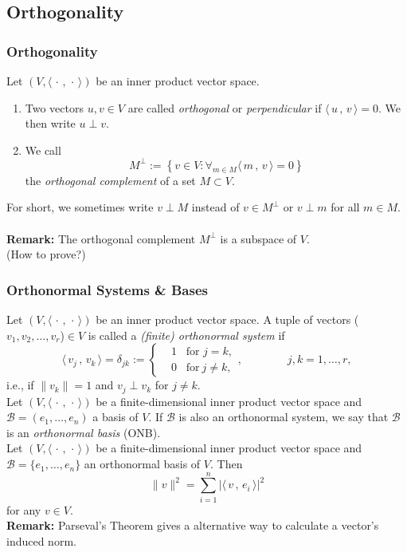 \documentclass[12pt, t]{beamer}
\renewcommand{\emph}[1]{{\color{Turquoise3}\textsl{#1}}}
\newcommand{\myseries}[2]{$#1_1,#1_2,\dots,#1_#2$}
\newcommand{\nullspace}{~\\[15pt]}
\newcommand{\remark}{\textbf{Remark: }}
\newcommand{\scp}[2]{\langle\,#1\,,\,#2\,\rangle} \newcommand{\scpp}{\langle\,\cdot\,,\,\cdot\,\rangle}
\begin{document}
\subsection{Orthogonality}
\begin{frame}[allowframebreaks]
    \frametitle{Orthogonality}
    Let $(V,\scpp)$ be an inner product vector space.
    \begin{enumerate}[1.]
        \item Two vectors $u,v\in V$ are called \emph{orthogonal} or \emph{perpendicular} if $\scp{u}{v}=0$. We then write $u\perp v$.
        \item We call
              \begin{equation*}
                  M^{\perp}:=\left\{v\in V:\mathop{\forall}_{m\in M}\scp{m}{v}=0\right\}
              \end{equation*}
              the \emph{orthogonal complement} of a set $M\subset V$.
    \end{enumerate}
    For short, we sometimes write $v\perp M$ instead of $v\in M^{\perp}$ or $v\perp m$ for all $m\in M$.
    \nullspace
    \remark The orthogonal complement $M^{\perp}$ is a subspace of $V$.\\
    (How to prove?)
\end{frame}

\begin{frame}[allowframebreaks]
    \frametitle{Orthonormal Systems \& Bases}
    Let $(V,\scpp)$ be an inner product vector space. A tuple of vectors (\myseries{v}{r})$\in V$ is called a \emph{(finite) orthonormal system} if
    \begin{equation*}
        \scp{v_j}{v_k}=\delta_{jk}:=\left\{\begin{aligned}&1\;\;\;\text{for }j=k,\\&0\;\;\;\text{for}~j\neq k,\end{aligned}\right.,\qquad\qquad j,k=1,\ldots,r,
    \end{equation*}
    i.e., if $\|v_k\|=1$ and $v_j\perp v_k$ for $j\neq k$.
    \nullspace
    Let $(V,\scpp)$ be a finite-dimensional inner product vector space and $\mathcal{B}=(e_1,\ldots,e_n)$ a basis of $V$. If $\mathcal{B}$ is also an orthonormal system, we say that $\mathcal{B}$ is an \emph{orthonormal basis} (ONB).\\
    \newpage
     Let $(V,\scpp)$ be a finite-dimensional inner product vector space and $\mathcal{B}=\{e_1,\ldots,e_n\}$ an orthonormal basis of $V$. Then
    \begin{equation*}
        \|v\|^2=\sum_{i=1}^{n}|\scp{v}{e_i}|^2
    \end{equation*}
    for any $v\in V$.
    \nullspace
    \remark Parseval’s Theorem gives a alternative way to calculate a vector's induced norm.
\end{frame}
\end{document}
